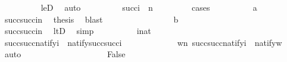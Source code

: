 \begin{isabellebody}
\ \ \ \ \ \ \ \ \isamarkupfalse%
\ leD\ \isamarkupfalse%
\ auto\isanewline
\ \ \ \ \ \ \isamarkupfalse%
\ \isamarkupfalse%
\ {\isachardoublequoteopen}succ{\isacharparenleft}{\kern0pt}i{\isacharparenright}{\kern0pt}\ {\isacharequal}{\kern0pt}\ n{\isachardoublequoteclose}\ \isanewline
\ \ \ \ \ \ \isamarkupfalse%
\ cases\isanewline
\ \ \ \ \ \ \ \ \isamarkupfalse%
\ a\isanewline
\ \ \ \ \ \ \ \ \isamarkupfalse%
\ {\isacartoucheopen}succ{\isacharparenleft}{\kern0pt}succ{\isacharparenleft}{\kern0pt}i{\isacharparenright}{\kern0pt}{\isacharparenright}{\kern0pt}{\isasymnoteq}n{\isacartoucheclose}\ \isamarkupfalse%
\ {\isacharquery}{\kern0pt}thesis\ \isamarkupfalse%
\ blast\isanewline
\ \ \ \ \ \ \isamarkupfalse%
\isanewline
\ \ \ \ \ \ \ \ \isamarkupfalse%
\ b\isanewline
\ \ \ \ \ \ \ \ \isamarkupfalse%
\ \isanewline
\ \ \ \ \ \ \ \ \isamarkupfalse%
\ {\isachardoublequoteopen}succ{\isacharparenleft}{\kern0pt}succ{\isacharparenleft}{\kern0pt}i{\isacharparenright}{\kern0pt}{\isacharparenright}{\kern0pt}{\isasymin}n{\isachardoublequoteclose}\ \isamarkupfalse%
\ ltD\ \isamarkupfalse%
\ simp\isanewline
\ \ \ \ \ \ \ \ \isamarkupfalse%
\ {\isacartoucheopen}i{\isasymin}nat{\isacartoucheclose}\isanewline
\ \ \ \ \ \ \ \ \isamarkupfalse%
\ {\isachardoublequoteopen}succ{\isacharparenleft}{\kern0pt}succ{\isacharparenleft}{\kern0pt}natify{\isacharparenleft}{\kern0pt}i{\isacharparenright}{\kern0pt}{\isacharparenright}{\kern0pt}{\isacharparenright}{\kern0pt}\ {\isasymnoteq}\ natify{\isacharparenleft}{\kern0pt}succ{\isacharparenleft}{\kern0pt}succ{\isacharparenleft}{\kern0pt}i{\isacharparenright}{\kern0pt}{\isacharparenright}{\kern0pt}{\isacharparenright}{\kern0pt}{\isachardoublequoteclose}\isanewline
\ \ \ \ \ \ \ \ \ \ \isamarkupfalse%
\ \ {\isacartoucheopen}{\isasymforall}w{\isasymin}n{\isachardot}{\kern0pt}\ succ{\isacharparenleft}{\kern0pt}succ{\isacharparenleft}{\kern0pt}natify{\isacharparenleft}{\kern0pt}i{\isacharparenright}{\kern0pt}{\isacharparenright}{\kern0pt}{\isacharparenright}{\kern0pt}\ {\isasymnoteq}\ natify{\isacharparenleft}{\kern0pt}w{\isacharparenright}{\kern0pt}{\isacartoucheclose}\ \isamarkupfalse%
\ auto\isanewline
\ \ \ \ \ \ \ \ \isamarkupfalse%
\ \isanewline
\ \ \ \ \ \ \ \ \isamarkupfalse%
\ {\isachardoublequoteopen}False{\isachardoublequoteclose}\ \isamarkupfalse%

\end{isabellebody}
